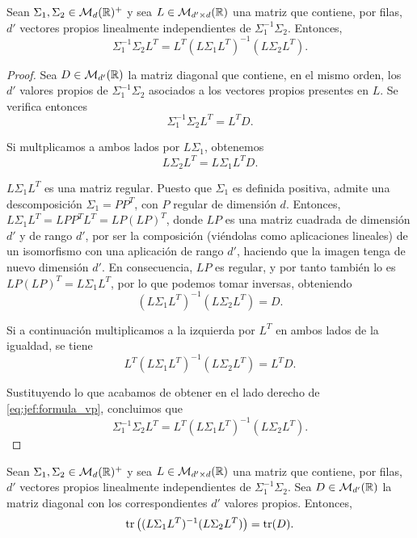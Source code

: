 \begin{thm}

    Sean $\Sigma_1, \Sigma_2 \in \mathcal{M}_d(\mathbb{R})^+$ y sea $L \in \mathcal{M}_{d'\times d}(\mathbb{R})$ una matriz que contiene, por filas, $d'$ vectores propios linealmente independientes de $\Sigma_1^{-1}\Sigma_2$. Entonces,
    \begin{equation} \label{eq:jef:thm1}
        \Sigma_1^{-1}\Sigma_2L^T = L^T(L\Sigma_1L^T)^{-1}(L\Sigma_2L^T).
    \end{equation}
\end{thm}

\begin{proof} \label{thm:dmlmj1}
    Sea $D \in \mathcal{M}_{d'}(\mathbb{R})$ la matriz diagonal que contiene, en el mismo orden, los $d'$ valores propios de $\Sigma_1^{-1}\Sigma_2$ asociados a los vectores propios presentes en $L$. Se verifica entonces
    \begin{equation}\label{eq:jef:formula_vp}
        \Sigma_1^{-1}\Sigma_2L^T = L^TD.
    \end{equation} 

    Si multplicamos a ambos lados por $L\Sigma_1$, obtenemos
    \[ L\Sigma_2L^T = L\Sigma_1L^TD. \]

    $L\Sigma_1L^T$ es una matriz regular. Puesto que $\Sigma_1$ es definida positiva, admite una descomposición $\Sigma_1 = PP^T$, con $P$ regular de dimensión $d$. Entonces, $L\Sigma_1L^T = LPP^TL^T = LP(LP)^T$, donde $LP$ es una matriz cuadrada de dimensión $d'$ y de rango $d'$, por ser la composición (viéndolas como aplicaciones lineales) de un isomorfismo con una aplicación de rango $d'$, haciendo que la imagen tenga de nuevo dimensión $d'$. En consecuencia, $LP$ es regular, y por tanto también lo es $LP(LP)^T = L\Sigma_1L^T$, por lo que podemos tomar inversas, obteniendo
    \begin{equation} \label{eq:jef:coro1_pre}
        (L\Sigma_1L^T)^{-1}(L\Sigma_2L^T) = D.
    \end{equation}

    Si a continuación multiplicamos a la izquierda por $L^T$ en ambos lados de la igualdad, se tiene
    \[ L^T(L\Sigma_1L^T)^{-1}(L\Sigma_2L^T) = L^TD. \]

    Sustituyendo lo que acabamos de obtener en el lado derecho de \ref{eq:jef:formula_vp}, concluimos que
    \[\Sigma_1^{-1}\Sigma_2L^T = L^T(L\Sigma_1L^T)^{-1}(L\Sigma_2L^T).\]

\end{proof}

\begin{cor} \label{cor:dmlmj1}
    Sean $\Sigma_1, \Sigma_2 \in \mathcal{M}_d(\mathbb{R})^+$ y sea $L \in \mathcal{M}_{d'\times d}(\mathbb{R})$ una matriz que contiene, por filas, $d'$ vectores propios linealmente independientes de $\Sigma_1^{-1}\Sigma_2$. Sea $D \in \mathcal{M}_{d'}(\mathbb{R})$ la matriz diagonal con los correspondientes $d'$ valores propios. Entonces,
    \[ \operatorname{tr}\left( (L\Sigma_1L^T)^{-1}(L\Sigma_2L^T) \right) = \operatorname{tr}(D). \]
\end{cor}

